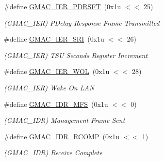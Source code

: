 \begin{DoxyCompactItemize}
\mbox{\label{group__SAMV71__GMAC_gad38d19aacd63d6e648838551070e6f68}} 
\#define \mbox{\hyperlink{group__SAMV71__GMAC_gad38d19aacd63d6e648838551070e6f68}{G\+M\+A\+C\+\_\+\+I\+E\+R\+\_\+\+P\+D\+R\+S\+FT}}~(0x1u $<$$<$ 25)
\begin{DoxyCompactList}\small\item\em (G\+M\+A\+C\+\_\+\+I\+ER) P\+Delay Response Frame Transmitted \end{DoxyCompactList}\item 
\mbox{\label{group__SAMV71__GMAC_ga7ef1f7c2933d88177c8266f8c5621041}} 
\#define \mbox{\hyperlink{group__SAMV71__GMAC_ga7ef1f7c2933d88177c8266f8c5621041}{G\+M\+A\+C\+\_\+\+I\+E\+R\+\_\+\+S\+RI}}~(0x1u $<$$<$ 26)
\begin{DoxyCompactList}\small\item\em (G\+M\+A\+C\+\_\+\+I\+ER) T\+SU Seconds Register Increment \end{DoxyCompactList}\item 
\mbox{\label{group__SAMV71__GMAC_gabc95f3b49e589e5ec2f67d507477f641}} 
\#define \mbox{\hyperlink{group__SAMV71__GMAC_gabc95f3b49e589e5ec2f67d507477f641}{G\+M\+A\+C\+\_\+\+I\+E\+R\+\_\+\+W\+OL}}~(0x1u $<$$<$ 28)
\begin{DoxyCompactList}\small\item\em (G\+M\+A\+C\+\_\+\+I\+ER) Wake On L\+AN \end{DoxyCompactList}\item 
\mbox{\label{group__SAMV71__GMAC_ga566f3409739031ca1621601dac156426}} 
\#define \mbox{\hyperlink{group__SAMV71__GMAC_ga566f3409739031ca1621601dac156426}{G\+M\+A\+C\+\_\+\+I\+D\+R\+\_\+\+M\+FS}}~(0x1u $<$$<$ 0)
\begin{DoxyCompactList}\small\item\em (G\+M\+A\+C\+\_\+\+I\+DR) Management Frame Sent \end{DoxyCompactList}\item 
\mbox{\label{group__SAMV71__GMAC_gadeb1d56444c642e1d190b22a575fb13f}} 
\#define \mbox{\hyperlink{group__SAMV71__GMAC_gadeb1d56444c642e1d190b22a575fb13f}{G\+M\+A\+C\+\_\+\+I\+D\+R\+\_\+\+R\+C\+O\+MP}}~(0x1u $<$$<$ 1)
\begin{DoxyCompactList}\small\item\em (G\+M\+A\+C\+\_\+\+I\+DR) Receive Complete \end{DoxyCompactList}\item 
$$
\end{DoxyCompactItemize}
